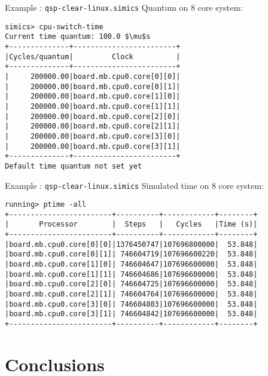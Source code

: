 \begin{frame}[fragile]{Example : \texttt{qsp-clear-linux.simics}}
Quantum on 8 core system:
\begin{lstlisting}[mathescape=true,keywordstyle=\ttfamily]
simics> cpu-switch-time
Current time quantum: 100.0 $\mu$s
+--------------+------------------------+
|Cycles/quantum|         Clock          |
+--------------+------------------------+
|     200000.00|board.mb.cpu0.core[0][0]|
|     200000.00|board.mb.cpu0.core[0][1]|
|     200000.00|board.mb.cpu0.core[1][0]|
|     200000.00|board.mb.cpu0.core[1][1]|
|     200000.00|board.mb.cpu0.core[2][0]|
|     200000.00|board.mb.cpu0.core[2][1]|
|     200000.00|board.mb.cpu0.core[3][0]|
|     200000.00|board.mb.cpu0.core[3][1]|
+--------------+------------------------+
Default time quantum not set yet
\end{lstlisting}
\end{frame}

\begin{frame}[fragile]{Example : \texttt{qsp-clear-linux.simics}}
Simulated time on 8 core system:
\begin{verbatim}
running> ptime -all
+------------------------+----------+------------+--------+
|       Processor        |  Steps   |   Cycles   |Time (s)|
+------------------------+----------+------------+--------+
|board.mb.cpu0.core[0][0]|1376450747|107696800000|  53.848|
|board.mb.cpu0.core[0][1]| 746604719|107696600220|  53.848|
|board.mb.cpu0.core[1][0]| 746604647|107696600000|  53.848|
|board.mb.cpu0.core[1][1]| 746604686|107696600000|  53.848|
|board.mb.cpu0.core[2][0]| 746604725|107696600000|  53.848|
|board.mb.cpu0.core[2][1]| 746604764|107696600000|  53.848|
|board.mb.cpu0.core[3][0]| 746604803|107696600000|  53.848|
|board.mb.cpu0.core[3][1]| 746604842|107696600000|  53.848|
+------------------------+----------+------------+--------+
\end{verbatim}
\end{frame}

\section*{Conclusions}

